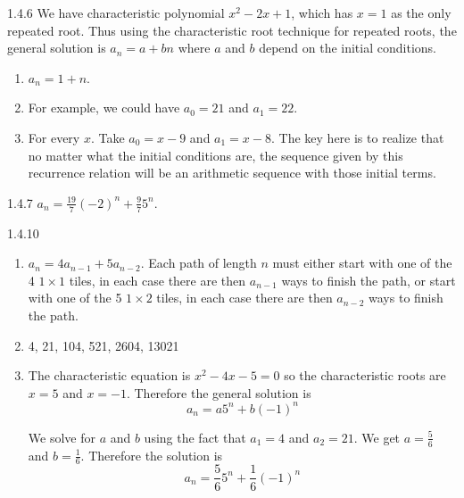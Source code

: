 \documentclass[11pt,]{book}
\theoremstyle{ptxplainnotitle}
\theoremstyle{ptxplaintitle}
\theoremstyle{ptxdefinitionnotitle}
\theoremstyle{ptxdefinitiontitle}
\theoremstyle{ptxdefinitionnotitle}
\theoremstyle{ptxdefinitiontitle}
\theoremstyle{ptxdefinitionnotitle}
\theoremstyle{ptxdefinitiontitle}
\theoremstyle{ptxdefinitiontitlenonumber}
\theoremstyle{ptxdefinitiontitlenonumber}
\numberwithin{equation}{chapter}
\begin{document}
\begin{divisionexercise}{1.4.6}
\textbf{}\hypertarget{p-496}{}%
We have characteristic polynomial \(x^2 - 2x + 1\), which has \(x = 1\) as the only repeated root.  Thus using the characteristic root technique for repeated roots, the general solution is \(a_n = a + bn\) where \(a\) and \(b\) depend on the initial conditions. \leavevmode%
\begin{enumerate}[label=(\alph*)]
\item\hypertarget{li-224}{}\(a_n = 1 + n\).%
\item\hypertarget{li-225}{}\hypertarget{p-497}{}%
For example, we could have \(a_0 = 21\) and \(a_1 = 22\).%
\item\hypertarget{li-226}{}\hypertarget{p-498}{}%
For every \(x\).  Take \(a_0 = x-9\) and \(a_1 = x-8\).  The key here is to realize that no matter what the initial conditions are, the sequence given by this recurrence relation will be an arithmetic sequence with those initial terms.%
\end{enumerate}
%
\end{divisionexercise}%
\begin{divisionexercise}{1.4.7}
\textbf{}\hypertarget{p-504}{}%
\(a_n = \frac{19}{7}(-2)^n + \frac{9}{7}5^n\text{.}\)%
\end{divisionexercise}%
\begin{divisionexercise}{1.4.10}
\textbf{}\hypertarget{p-513}{}%
\leavevmode%
\begin{enumerate}[label=(\alph*)]
\item\hypertarget{li-232}{}\hypertarget{p-514}{}%
\(a_n = 4a_{n-1} + 5a_{n-2}\). Each path of length \(n\) must either start with one of the 4 \(1\times 1\) tiles, in each case there are then \(a_{n-1}\) ways to finish the path, or start with one of the 5 \(1\times 2\) tiles, in each case there are then \(a_{n-2}\) ways to finish the path.%
\item\hypertarget{li-233}{}\hypertarget{p-515}{}%
4, 21, 104, 521, 2604, 13021%
\item\hypertarget{li-234}{}\hypertarget{p-516}{}%
The characteristic equation is \(x^2 - 4x - 5 = 0\) so the characteristic roots are \(x = 5\) and \(x = -1\). Therefore the general solution is%
\begin{equation*}
a_n = a 5^n + b (-1)^n
\end{equation*}
%
\par
\hypertarget{p-517}{}%
We solve for \(a\) and \(b\) using the fact that \(a_1 = 4\) and \(a_2 = 21\). We get \(a = \frac{5}{6}\) and \(b = \frac{1}{6}\). Therefore the solution is%
\begin{equation*}
a_n = \frac{5}{6} 5^n + \frac{1}{6}(-1)^n
\end{equation*}
%
\end{enumerate}
%
\end{divisionexercise}%
\end{document}
